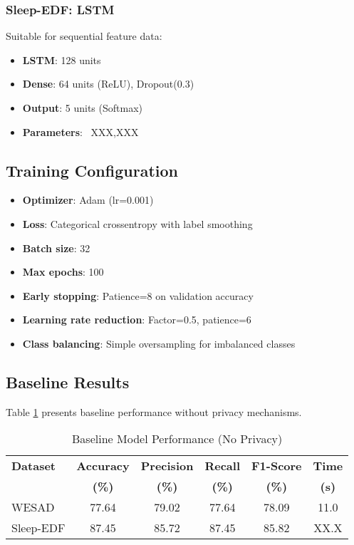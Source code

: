 \documentclass[conference]{IEEEtran}
\begin{document}
\subsubsection{Sleep-EDF: LSTM}

Suitable for sequential feature data:

\begin{itemize}
    \item \textbf{LSTM}: 128 units
    \item \textbf{Dense}: 64 units (ReLU), Dropout(0.3)
    \item \textbf{Output}: 5 units (Softmax)
    \item \textbf{Parameters}: ~XXX,XXX
\end{itemize}

\subsection{Training Configuration}

\begin{itemize}
    \item \textbf{Optimizer}: Adam (lr=0.001)
    \item \textbf{Loss}: Categorical crossentropy with label smoothing
    \item \textbf{Batch size}: 32
    \item \textbf{Max epochs}: 100
    \item \textbf{Early stopping}: Patience=8 on validation accuracy
    \item \textbf{Learning rate reduction}: Factor=0.5, patience=6
    \item \textbf{Class balancing}: Simple oversampling for imbalanced classes
\end{itemize}

\subsection{Baseline Results}

Table \ref{tab:baseline_results} presents baseline performance without privacy mechanisms.

\begin{table}[htbp]
\centering
\caption{Baseline Model Performance (No Privacy)}
\label{tab:baseline_results}
\begin{tabular}{@{}lccccc@{}}
\toprule
\textbf{Dataset} & \textbf{Accuracy} & \textbf{Precision} & \textbf{Recall} & \textbf{F1-Score} & \textbf{Time} \\
 & \textbf{(\%)} & \textbf{(\%)} & \textbf{(\%)} & \textbf{(\%)} & \textbf{(s)} \\ \midrule
WESAD    & 77.64 & 79.02 & 77.64 & 78.09 & 11.0 \\
Sleep-EDF & 87.45 & 85.72 & 87.45 & 85.82 & XX.X \\ \bottomrule
\end{tabular}
\end{table}
\end{document}
